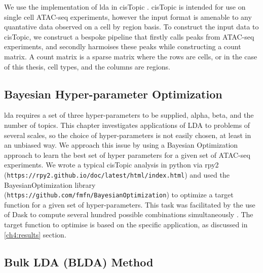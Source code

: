 We use the implementation of \gls{lda} in cisTopic \cite{BravoGonzalez-Blas2019}. cisTopic is intended for use on single cell ATAC-seq experiments, however the input format is amenable to any quantative data observed on a cell by region basis. To construct the input data to cisTopic, we construct a bespoke pipeline that firstly calls peaks from ATAC-seq experiments, and secondly harmoises these peaks while constructing a count matrix. A count matrix is a sparse matrix where the rows are cells, or in the case of this thesis, cell types, and the columns are regions.



\subsection{Bayesian Hyper-parameter Optimization} \label{ch4:hyper}

\gls{lda} requires a set of three hyper-parameters to be supplied, alpha, beta, and the number of topics. This chapter investigates applications of LDA to problems of several scales, so the choice of hyper-parameters is not easily chosen, at least in an unbiased way. We approach this issue by using a Bayesian Optimization approach to learn the best set of hyper parameters for a given set of ATAC-seq experiments. We wrote a typical cisTopic analysis in python via rpy2 ({\tt https://rpy2.github.io/doc/latest/html/index.html}) and used the BayesianOptimization library ({\tt https://github.com/fmfn/BayesianOptimization}) to optimize a target function for a given set of hyper-parameters. This task was facilitated by the use of Dask to compute several hundred possible combinations simultaneously \cite{Rocklin2015}. The target function to optimise is based on the specific application, as discussed in \autoref{ch4:results} section.

\subsection{Bulk LDA (BLDA) Method}

